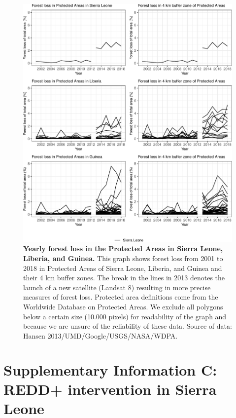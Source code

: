 \documentclass[
]{article}
\begin{document}
\begin{figure}[H]

{\centering \includegraphics{paper_REDD_replication_files/figure-latex/figForestlossCountry-1} 

}

\caption{\textbf{Yearly forest loss in the Protected Areas in Sierra Leone, Liberia, and Guinea.} This graph shows forest loss from 2001 to 2018 in Protected Areas of Sierra Leone, Liberia, and Guinea and their 4 km buffer zones. The break in the lines in 2013 denotes the launch of a new satellite (Landsat 8) resulting in more precise measures of forest loss. Protected area definitions come from the Worldwide Database on Protected Areas. We exclude all polygons below a certain size (10.000 pixels) for readability of the graph and because we are unsure of the reliability of these data. Source of data: Hansen 2013/UMD/Google/USGS/NASA/WDPA.}\label{fig:figForestlossCountry}
\end{figure}
\newpage
\setcounter{table}{0}  
\renewcommand{\thetable}{C\arabic{table}}
\setcounter{figure}{0} 
\renewcommand{\thefigure}{C\arabic{figure}}

\hypertarget{supplementary-information-c-redd-intervention-in-sierra-leone}{%
\section*{Supplementary Information C: REDD+ intervention in Sierra
Leone}\label{supplementary-information-c-redd-intervention-in-sierra-leone}}
\end{document}

